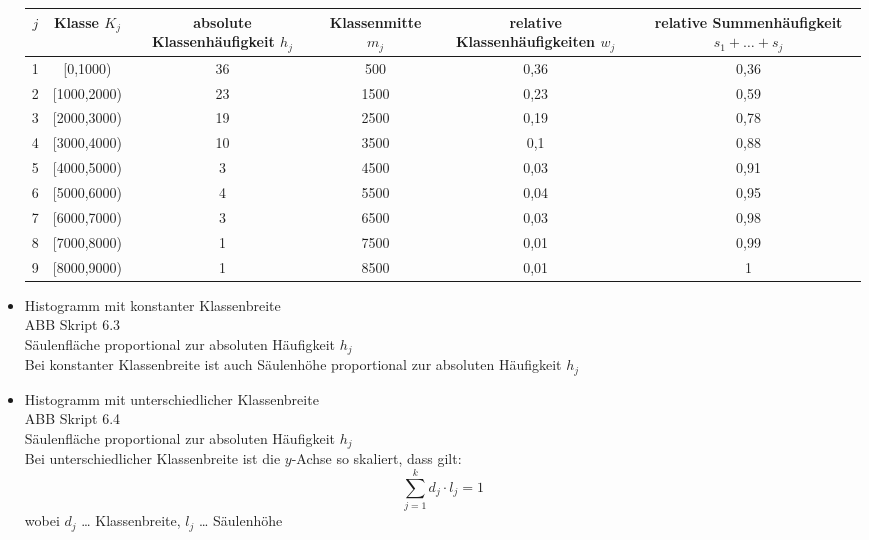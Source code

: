 \begin{itemize}
\begin{tabular}{c C{0.18} C{0.18} C{0.18} C{0.18} C{0.18}}
$j$ & Klasse $K_j$ & absolute Klassenhäufigkeit $h_j$ & Klassenmitte $m_j$ & relative Klassenhäufigkeiten $w_j$ & relative Summenhäufigkeit $s_1+\ldots + s_j$\\ & [0,1000) & 36 & 500 & 0,36 & 0,36\\
2 & [1000,2000) & 23 & 1500 & 0,23 & 0,59\\
3 & [2000,3000) & 19 & 2500 & 0,19 & 0,78\\
4 & [3000,4000) & 10 & 3500 & 0,1 & 0,88\\
5 & [4000,5000) & 3 & 4500 & 0,03 & 0,91\\
6 & [5000,6000) & 4 & 5500 & 0,04 & 0,95\\
7 & [6000,7000) & 3 & 6500 & 0,03 & 0,98\\
8 & [7000,8000) & 1 & 7500 & 0,01 & 0,99\\
9 & [8000,9000) & 1 & 8500 & 0,01 & 1\\
\end{tabular}
\item Histogramm mit konstanter Klassenbreite\\
ABB Skript 6.3\\
Säulenfläche proportional zur absoluten Häufigkeit $h_j$\\
Bei konstanter Klassenbreite ist auch Säulenhöhe proportional zur absoluten Häufigkeit $h_j$
\item Histogramm mit unterschiedlicher Klassenbreite\\
ABB Skript 6.4\\
Säulenfläche proportional zur absoluten Häufigkeit $h_j$\\
Bei unterschiedlicher Klassenbreite ist die $y$-Achse so skaliert, dass gilt:
$$\sum_{j=1}^k d_j \cdot l_j = 1$$
wobei $d_j$ … Klassenbreite, $l_j$ … Säulenhöhe
\end{itemize} 


